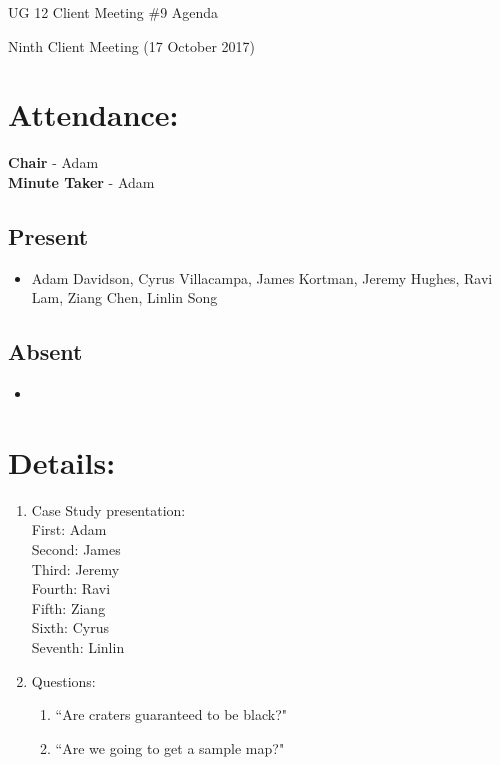 \documentclass{article}
\begin{document}
\begin{adjustwidth}{2.5em}{0pt}
\begin{center}
\Large{UG 12 Client Meeting \#9 Agenda}\\
\end{center}
\end{adjustwidth}

Ninth Client Meeting (17 October 2017)
\section{Attendance:}
\textbf{Chair} - Adam\\
\textbf{Minute Taker} - Adam\\
\subsection*{Present}
\begin{itemize}
\item Adam Davidson, Cyrus Villacampa, James Kortman, Jeremy Hughes, Ravi Lam, Ziang Chen, Linlin Song
\end{itemize}
\subsection*{Absent}
\begin{itemize}
\item  
\end {itemize}

\section{Details:}
\begin{enumerate}
\item Case Study presentation:\\
First: Adam\\
Second: James\\
Third: Jeremy\\
Fourth: Ravi\\
Fifth: Ziang\\
Sixth: Cyrus\\
Seventh: Linlin\\
\item Questions:\begin{enumerate}
	\item “Are craters guaranteed to be black?"
	\item  “Are we going to get a sample map?" \end{enumerate}

\end{enumerate}
\end{document}
